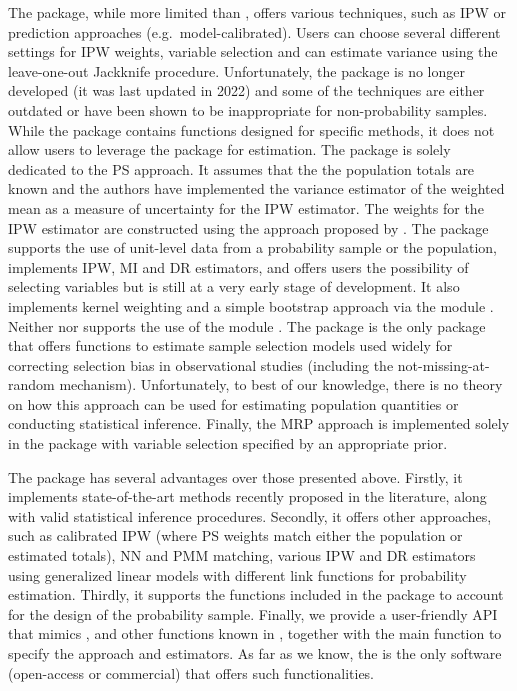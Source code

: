 \documentclass[
]{jss}
\begin{document}
The  package, while more limited than ,
offers various techniques, such as IPW or prediction approaches
(e.g.~model-calibrated). Users can choose several different settings for
IPW weights, variable selection and can estimate variance using the
leave-one-out Jackknife procedure. Unfortunately, the package is no
longer developed (it was last updated in 2022) and some of the
techniques are either outdated or have been shown to be inappropriate
for non-probability samples. While the package contains functions
designed for specific methods, it does not allow users to leverage the
 package for estimation. The  package is solely
dedicated to the PS approach. It assumes that the the population totals
are known and the authors have implemented the variance estimator of the
weighted mean as a measure of uncertainty for the IPW estimator. The
weights for the IPW estimator are constructed using the approach
proposed by \citet{Schonlau2017}. The  package supports the
use of unit-level data from a probability sample or the population,
implements IPW, MI and DR estimators, and offers users the possibility
of selecting variables but is still at a very early stage of
development. It also implements kernel weighting and a simple bootstrap
approach via the  module \citep{scipy2020}. Neither
 nor  supports the use of the 
module \citep{Diallo2021}. The  package is the only package
that offers functions to estimate sample selection models used widely
for correcting selection bias in observational studies (including the
not-missing-at-random mechanism). Unfortunately, to best of our
knowledge, there is no theory on how this approach can be used for
estimating population quantities or conducting statistical inference.
Finally, the MRP approach is implemented solely in the 
package with variable selection specified by an appropriate prior.

The  package has several advantages over those presented
above. Firstly, it implements state-of-the-art methods recently proposed
in the literature, along with valid statistical inference procedures.
Secondly, it offers other approaches, such as calibrated IPW (where PS
weights match either the population or estimated totals), NN and PMM
matching, various IPW and DR estimators using generalized linear models
with different link functions for probability estimation. Thirdly, it
supports the functions included in the  package to account
for the design of the probability sample. Finally, we provide a
user-friendly API that mimics ,  and
other functions known in , together with the main function
to specify the approach and estimators. As far as we know, the
 is the only software (open-access or commercial) that
offers such functionalities.
\end{document}
